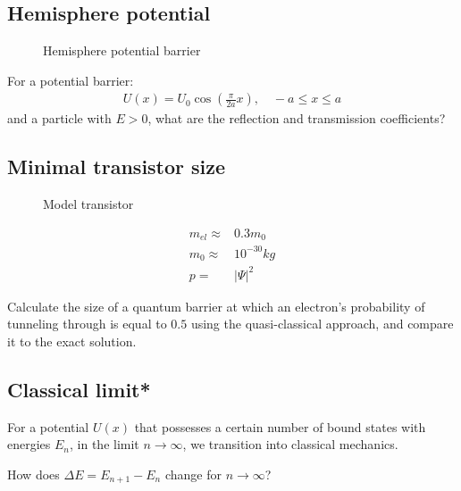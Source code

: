 		\subsection{Hemisphere potential}
			\begin{figure}[!h]
				\centering
				
				\caption{Hemisphere potential barrier}
			\end{figure}
			For a potential barrier:
			\begin{align}
				U(x) = U_0 \cos(\frac{\pi}{2a}x), \quad -a \leq x \leq a
			\end{align}
			and a particle with $E > 0$, what are the reflection and transmission coefficients?
		\subsection{Minimal transistor size}
			\begin{figure}[!h]
				\centering
				
				\caption{Model transistor}
			\end{figure}
			
			\begin{align}
				m_{el} \approx& 0.3 m_0 \\
				m_0 \approx& 10^{-30}\si{kg} \\
				p =& |\Psi|^2
			\end{align}			
			
			Calculate the size of a quantum barrier at which an electron's probability of tunneling through is equal to $0.5$ using the quasi-classical approach, and compare it to the exact solution.
		
		\subsection{Classical limit*}	
			For a potential $U(x)$ that possesses a certain number of bound states with energies $E_n$, in the limit $n\rightarrow\infty$, we transition into classical mechanics. 
			
			How does $\Delta E = E_{n+1}-E_n$ change for $n\rightarrow\infty$?
